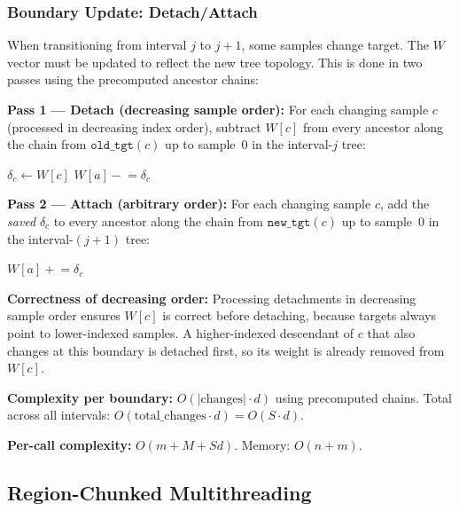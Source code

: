 \documentclass[11pt]{article}
\begin{document}
\subsubsection{Boundary Update: Detach/Attach}
\label{sec:left-boundary}

When transitioning from interval $j$ to $j{+}1$, some samples change
target.  The $W$ vector must be updated to reflect the new tree topology.
This is done in two passes using the precomputed ancestor chains:

\textbf{Pass 1 --- Detach (decreasing sample order):}
For each changing sample $c$ (processed in decreasing index order), subtract
$W[c]$ from every ancestor along the chain from $\texttt{old\_tgt}(c)$ up
to sample~0 in the interval-$j$ tree:
\begin{algorithmic}[1]
    \State $\delta_c \gets W[c]$
        \State $W[a] \mathrel{-}= \delta_c$
    \EndFor
\EndFor
\end{algorithmic}

\textbf{Pass 2 --- Attach (arbitrary order):}
For each changing sample $c$, add the \emph{saved} $\delta_c$ to every
ancestor along the chain from $\texttt{new\_tgt}(c)$ up to sample~0 in the
interval-$(j{+}1)$ tree:
\begin{algorithmic}[1]
        \State $W[a] \mathrel{+}= \delta_c$
    \EndFor
\EndFor
\end{algorithmic}

\textbf{Correctness of decreasing order:}  Processing detachments in
decreasing sample order ensures $W[c]$ is correct before detaching, because
targets always point to lower-indexed samples.  A higher-indexed descendant
of $c$ that also changes at this boundary is detached first, so its weight
is already removed from $W[c]$.

\textbf{Complexity per boundary:} $O(|\text{changes}| \cdot d)$ using
precomputed chains.  Total across all intervals:
$O(\text{total\_changes} \cdot d) = O(S \cdot d)$.

\textbf{Per-call complexity:} $O(m + M + Sd)$.  Memory: $O(n + m)$.

\subsection{Region-Chunked Multithreading}
\label{sec:multithreading}
\end{document}
